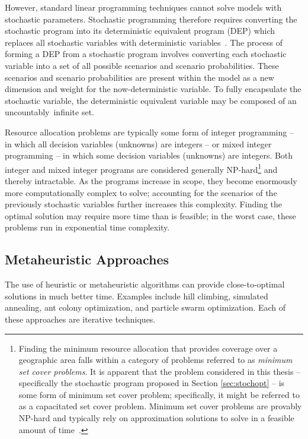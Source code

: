 \documentclass[12pt,dvipsnames]{report}
\begin{document}
However, standard linear programming techniques cannot solve models with stochastic parameters.  Stochastic programming therefore requires converting the stochastic program into its deterministic equivalent program (DEP) which replaces all stochastic variables with deterministic variables~\cite{stochprogramming}.  The process of forming a DEP from a stochastic program involves converting each stochastic variable into a set of all possible scenarios and scenario probabilities.  These scenarios and scenario probabilities are present within the model as a new dimension and weight for the now-deterministic variable.  To fully encapsulate the stochastic variable, the deterministic equivalent variable may be composed of an uncountably~infinite set.

Resource allocation problems are typically some form of integer programming -- in which all decision variables (unknowns) are integers -- or mixed integer programming -- in which some decision variables (unknowns) are integers.  Both integer and mixed integer programs are considered generally NP-hard\footnote{Finding the minimum resource allocation that provides coverage over a geographic area falls within a category of problems referred to as \emph{minimum set cover problems}.  It is apparent that the problem considered in this thesis -- specifically the stochastic program proposed in Section \ref{sec:stochopt} -- is some form of minimum set cover problem; specifically, it might be referred to as a capacitated set cover problem.  Minimum set cover problems are provably NP-hard and typically rely on approximation solutions to solve in a feasible amount of time~\cite{Korte:2007:CombOptimization}.} and thereby intractable.  As the programs increase in scope, they become enormously more computationally complex to solve; accounting for the scenarios of the previously stochastic variables further increases this complexity.  Finding the optimal solution may require more time than is feasible; in the worst case, these problems run in exponential time complexity.

\subsection{Metaheuristic Approaches} \label{subsec:optreview_meta}

The use of heuristic or metaheuristic algorithms can provide close-to-optimal solutions in much better time.  Examples include hill climbing, simulated annealing, ant colony optimization, and particle swarm optimization.  Each of these approaches are iterative techniques.
\end{document}

